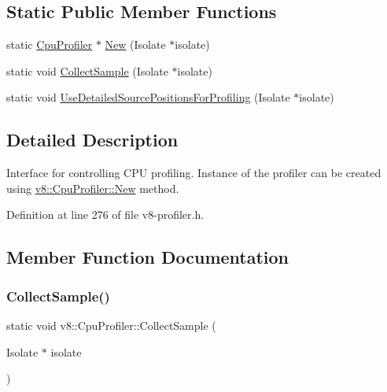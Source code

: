 \subsection*{Static Public Member Functions}
\begin{DoxyCompactItemize}
\item 
static \mbox{\hyperlink{classv8_1_1CpuProfiler}{Cpu\+Profiler}} $\ast$ \mbox{\hyperlink{classv8_1_1CpuProfiler_a9850aa42c5580c686cde1555f09577aa}{New}} (Isolate $\ast$isolate)
\item 
static void \mbox{\hyperlink{classv8_1_1CpuProfiler_a88b787078f0c8742b3c077af0de4f46b}{Collect\+Sample}} (Isolate $\ast$isolate)
\item 
static void \mbox{\hyperlink{classv8_1_1CpuProfiler_ae62325c49592ebdc030fbcf21e470c16}{Use\+Detailed\+Source\+Positions\+For\+Profiling}} (Isolate $\ast$isolate)
\end{DoxyCompactItemize}


\subsection{Detailed Description}
Interface for controlling C\+PU profiling. Instance of the profiler can be created using \mbox{\hyperlink{classv8_1_1CpuProfiler_a9850aa42c5580c686cde1555f09577aa}{v8\+::\+Cpu\+Profiler\+::\+New}} method. 

Definition at line 276 of file v8-\/profiler.\+h.



\subsection{Member Function Documentation}
\mbox{\label{classv8_1_1CpuProfiler_a88b787078f0c8742b3c077af0de4f46b}} 
\subsubsection{\texorpdfstring{Collect\+Sample()}{CollectSample()}}
{\footnotesize\ttfamily static void v8\+::\+Cpu\+Profiler\+::\+Collect\+Sample (\begin{DoxyParamCaption}\item[{Isolate $\ast$}]{isolate }\end{DoxyParamCaption})\hspace{0.3cm}{\ttfamily [static]}}

